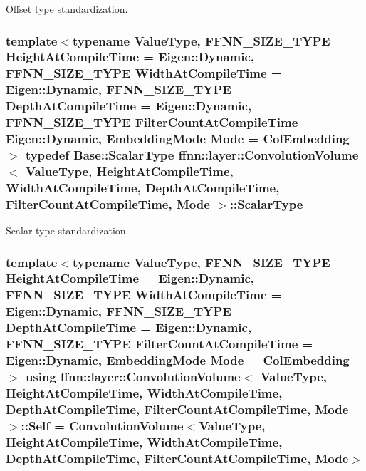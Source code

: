 Offset type standardization. 

\hypertarget{classffnn_1_1layer_1_1_convolution_volume_aee5896ca6c930a673234c66446753432}{
\subsubsection[{Scalar\-Type}]{\setlength{\rightskip}{0pt plus 5cm}template$<$typename Value\-Type, F\-F\-N\-N\-\_\-\-S\-I\-Z\-E\-\_\-\-T\-Y\-P\-E Height\-At\-Compile\-Time = Eigen\-::\-Dynamic, F\-F\-N\-N\-\_\-\-S\-I\-Z\-E\-\_\-\-T\-Y\-P\-E Width\-At\-Compile\-Time = Eigen\-::\-Dynamic, F\-F\-N\-N\-\_\-\-S\-I\-Z\-E\-\_\-\-T\-Y\-P\-E Depth\-At\-Compile\-Time = Eigen\-::\-Dynamic, F\-F\-N\-N\-\_\-\-S\-I\-Z\-E\-\_\-\-T\-Y\-P\-E Filter\-Count\-At\-Compile\-Time = Eigen\-::\-Dynamic, Embedding\-Mode Mode = Col\-Embedding$>$ typedef {\bf Base\-::\-Scalar\-Type} {\bf ffnn\-::layer\-::\-Convolution\-Volume}$<$ Value\-Type, Height\-At\-Compile\-Time, Width\-At\-Compile\-Time, Depth\-At\-Compile\-Time, Filter\-Count\-At\-Compile\-Time, Mode $>$\-::{\bf Scalar\-Type}}}\label{classffnn_1_1layer_1_1_convolution_volume_aee5896ca6c930a673234c66446753432}


Scalar type standardization. 

\hypertarget{classffnn_1_1layer_1_1_convolution_volume_a176ff3362c3ce073b92f837b65cde684}{
\subsubsection[{Self}]{\setlength{\rightskip}{0pt plus 5cm}template$<$typename Value\-Type, F\-F\-N\-N\-\_\-\-S\-I\-Z\-E\-\_\-\-T\-Y\-P\-E Height\-At\-Compile\-Time = Eigen\-::\-Dynamic, F\-F\-N\-N\-\_\-\-S\-I\-Z\-E\-\_\-\-T\-Y\-P\-E Width\-At\-Compile\-Time = Eigen\-::\-Dynamic, F\-F\-N\-N\-\_\-\-S\-I\-Z\-E\-\_\-\-T\-Y\-P\-E Depth\-At\-Compile\-Time = Eigen\-::\-Dynamic, F\-F\-N\-N\-\_\-\-S\-I\-Z\-E\-\_\-\-T\-Y\-P\-E Filter\-Count\-At\-Compile\-Time = Eigen\-::\-Dynamic, Embedding\-Mode Mode = Col\-Embedding$>$ using {\bf ffnn\-::layer\-::\-Convolution\-Volume}$<$ Value\-Type, Height\-At\-Compile\-Time, Width\-At\-Compile\-Time, Depth\-At\-Compile\-Time, Filter\-Count\-At\-Compile\-Time, Mode $>$\-::{\bf Self} =  {\bf Convolution\-Volume}$<$Value\-Type, Height\-At\-Compile\-Time, Width\-At\-Compile\-Time, Depth\-At\-Compile\-Time, Filter\-Count\-At\-Compile\-Time, Mode$>$}}\label{classffnn_1_1layer_1_1_convolution_volume_a176ff3362c3ce073b92f837b65cde684}


